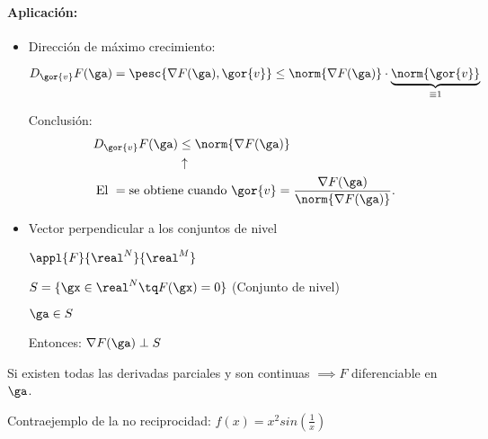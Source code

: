 \paragraph{Aplicación:} 
\begin{itemize}
 \item 
 Dirección de máximo crecimiento:

$D_{\gor{v}}F(\ga) = \pesc{\nabla F(\ga),\gor{v}}\leq \norm{\nabla F(\ga)}\cdot \underbrace{\norm{\gor{v}}}_{\equiv 1}$

Conclusión:
\begin{align*}
D_{\gor{v}}F(\ga) &\leq \norm{\nabla F(\ga)}\\
&\uparrow\\
\text{El }= \text{se obtien}&\text{e cuando }\gor{v} = \displaystyle \frac{\nabla F(\ga)}{\norm{\nabla F(\ga)}}. 
\end{align*}

 
 \item
 Vector perpendicular a los conjuntos de nivel
 
 $\appl{F}{\real^N}{\real^M}$
 
 $S = \{ \gx \in \real^N \tq F(\gx) = 0\}$ (Conjunto de nivel)
 
 $\ga \in S$
 
 Entonces: $\nabla F(\ga) \perp S$
\end{itemize}

\begin{theorem}
Si existen todas las derivadas parciales y son continuas $\implies F$ diferenciable en $\ga$.
 
\end{theorem}

Contraejemplo de la no reciprocidad: $f(x) = x^2 sin\left(\frac{1}{x}\right)$

